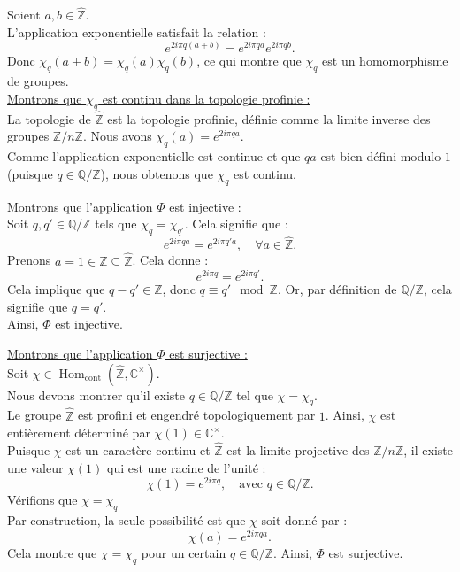 \documentclass[a4paper, 14pt]{report}
\begin{document}
\begin{onehalfspace}
{			Soient $a, b \in \widehat{\mathbb{Z}}$.\\
			
			L'application exponentielle satisfait la relation :
			\[
			e^{2i\pi q (a + b)} = e^{2i\pi q a} e^{2i\pi q b}.
			\]
			Donc $\chi_q(a + b) = \chi_q(a) \chi_q(b)$, ce qui montre que $\chi_q$ est un homomorphisme de groupes.\\
			
			\underline{Montrons que $\chi_q$ est continu dans la topologie profinie :}\\
			
			La topologie de $\widehat{\mathbb{Z}}$ est la topologie profinie, définie comme la limite inverse des groupes $\mathbb{Z}/n\mathbb{Z}$. Nous avons $\chi_q(a) = e^{2i\pi q a}$. \\
			Comme l'application exponentielle est continue et que $q a$ est bien défini modulo $1$ (puisque $q \in \mathbb{Q}/\mathbb{Z}$), nous obtenons que $\chi_q$ est continu.
			
			
			\underline{Montrons que l'application $\Phi$ est injective :}\\
			
			Soit $q, q' \in \mathbb{Q}/\mathbb{Z}$ tels que $\chi_q = \chi_{q'}$. Cela signifie que :
			\[
			e^{2i\pi q a} = e^{2i\pi q' a}, \quad \forall a \in \widehat{\mathbb{Z}}.
			\]
			Prenons $a = 1 \in \mathbb{Z} \subseteq \widehat{\mathbb{Z}}$. Cela donne :
			\[
			e^{2i\pi q} = e^{2i\pi q'}.
			\]
			Cela implique que $q - q' \in \mathbb{Z}$, donc $q \equiv q' \mod \mathbb{Z}$. Or, par définition de $\mathbb{Q}/\mathbb{Z}$, cela signifie que $q = q'$.\\ 
			Ainsi, $\Phi$ est injective.
			
			\underline{Montrons que l'application $\Phi$ est surjective :}\\
			
			Soit $\chi \in \operatorname{Hom}_{\text{cont}}(\widehat{\mathbb{Z}}, \mathbb{C}^\times)$.  \\
			Nous devons montrer qu'il existe $q \in \mathbb{Q}/\mathbb{Z}$ tel que $\chi = \chi_q$.\\
			Le groupe $\widehat{\mathbb{Z}}$ est profini et engendré topologiquement par $1$. Ainsi, $\chi$ est entièrement déterminé par $\chi(1) \in \mathbb{C}^\times$.\\
			Puisque $\chi$ est un caractère continu et $\widehat{\mathbb{Z}}$ est la limite projective des $\mathbb{Z}/n\mathbb{Z}$, il existe une valeur $\chi(1)$ qui est une racine de l’unité :
			\[
			\chi(1) = e^{2i\pi q}, \quad \text{avec } q \in \mathbb{Q}/\mathbb{Z}.
			\]
			Vérifions que $\chi = \chi_q$\\
			Par construction, la seule possibilité est que $\chi$ soit donné par :
			\[
			\chi(a) = e^{2i\pi q a}.
			\]
			Cela montre que $\chi = \chi_q$ pour un certain $q \in \mathbb{Q}/\mathbb{Z}$. Ainsi, $\Phi$ est surjective.
			
}
\end{onehalfspace}
\end{document}
